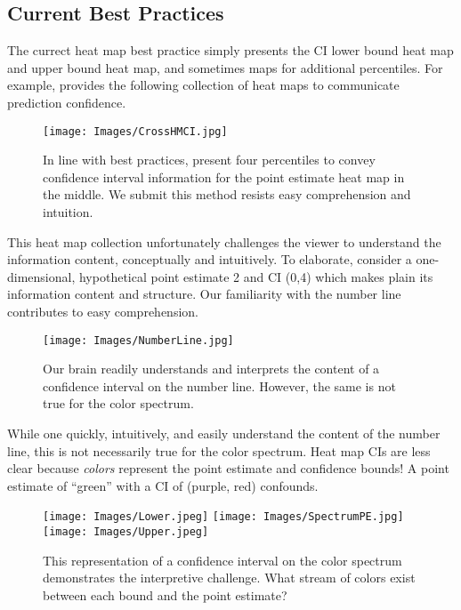 \subsection{Current Best Practices}

The currect heat map best practice simply presents the CI lower bound heat map and upper bound heat map, and sometimes maps for additional percentiles. For example, \cite{Cross2015} provides the following collection of heat maps to communicate prediction confidence.

  \begin{figure}[H]
	\texttt{[image: Images/CrossHMCI.jpg]}
	\caption{In line with best practices, \cite{Cross2015} present four percentiles to convey confidence interval information for the point estimate heat map in the middle. We submit this method resists easy comprehension and intuition.}
	\end{figure}

This heat map collection unfortunately challenges the viewer to understand the information content, conceptually and intuitively. To elaborate, consider a one-dimensional, hypothetical point estimate 2 and CI (0,4) which makes plain its information content and structure. Our familiarity with the number line contributes to easy comprehension.
  \begin{figure}[H]
  \centering
	\texttt{[image: Images/NumberLine.jpg]}
	\caption{Our brain readily understands and interprets the content of a confidence interval on the number line. However, the same is not true for the color spectrum.}
	\end{figure}
While one quickly, intuitively, and easily understand the content of the number line, this is not necessarily true for the color spectrum. Heat map CIs are less clear because {\it colors} represent the point estimate and confidence bounds! A point estimate of ``green'' with a CI of (purple, red) confounds.
  \begin{figure}[H]
  \centering
	\texttt{[image: Images/Lower.jpeg]}
	\texttt{[image: Images/SpectrumPE.jpg]}
	\texttt{[image: Images/Upper.jpeg]}

	\caption{This representation of a confidence interval on the color spectrum demonstrates the interpretive challenge. What stream of colors exist between each bound and the point estimate?}
	\end{figure}

